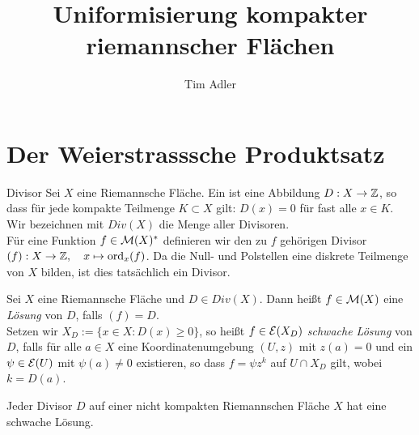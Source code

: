 
\title{Uniformisierung kompakter riemannscher Flächen}
\author{Tim Adler}





\section{Der Weierstrasssche Produktsatz}
\label{sec:Weierstrass}

\begin{defin}{Divisor}
  Sei $X$ eine Riemannsche Fläche. Ein  ist eine
  Abbildung $D: X \rightarrow \mathbb{Z}$, so dass für jede kompakte Teilmenge $K
  \subset X$ gilt: $D(x) = 0$ für fast alle $x \in K$. \\
  Wir bezeichnen mit $Div(X)$ die Menge aller Divisoren. \\
  Für eine Funktion $f \in \mathcal{M}(X)^\ast$ definieren wir den zu $f$
  gehörigen Divisor $(f): X \rightarrow \mathbb{Z}, \quad x \mapsto \operatorname{ord}_x(f)$. Da die
  Null- und Polstellen eine diskrete Teilmenge von $X$ bilden, ist
  dies tatsächlich ein Divisor.
\end{defin}

\begin{defin}
  Sei $X$ eine Riemannsche Fläche und $D \in Div(X)$. Dann heißt $f
  \in \mathcal{M}(X)$ eine \emph{Lösung} von $D$, falls $(f) = D$. \\
  Setzen wir $X_D := \{x \in X: D(x) \geq 0 \}$, so heißt $f \in
  \mathcal{E}(X_D)$ \emph{schwache Lösung} von $D$, falls für alle $a \in X$
  eine Koordinatenumgebung $(U,z)$ mit $z(a) = 0$ und ein $\psi \in
  \mathcal{E}(U)$ mit $\psi(a) \neq 0$ existieren, so dass $f = \psi z^k$
  auf $ U \cap X_D$ gilt, wobei $k = D(a)$.
\end{defin}

\begin{lemma}
  \label{lemma:schwache-Lösung-Divisor}
  Jeder Divisor $D$ auf einer nicht kompakten Riemannschen Fläche $X$ hat eine
  schwache Lösung.
\end{lemma}

